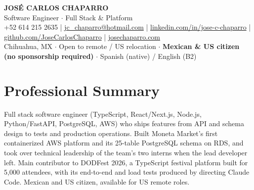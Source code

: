 \documentclass[10pt,letterpaper]{article}
\newif\ifbackend
\begin{document}

\begin{center}
    {\Huge\bfseries\color{accent} JOSÉ CARLOS CHAPARRO}\\[1pt]
    {\large \ifbackend Software Engineer $\cdot$ Backend \& Infrastructure\else Software Engineer $\cdot$ Full Stack \& Platform\fi}\\[2pt]
    \footnotesize
    +52 614 215 2635 | \href{mailto:jc_chaparro@hotmail.com}{jc\_chaparro@hotmail.com} | \href{https://www.linkedin.com/in/jose-c-chaparro/}{linkedin.com/in/jose-c-chaparro} | \href{https://github.com/JoseCarlosChaparro}{github.com/JoseCarlosChaparro} | \href{https://www.josechaparro.com}{josechaparro.com}\\[1pt]
    Chihuahua, MX $\cdot$ Open to remote / US relocation $\cdot$ \textbf{Mexican \& US citizen (no sponsorship required)} $\cdot$ Spanish (native) / English (B2)
\end{center}

\section*{Professional Summary}
\ifbackend
Backend software engineer (Python/FastAPI, PostgreSQL, AWS, Docker) who designs and runs production systems end to end. Built Moneta Market's first containerized AWS platform and its 25-table PostgreSQL schema on RDS, and took over technical leadership of the team's two interns when the lead developer left. Previously extended a VB.NET and SQL Server ERP used by 1,750+ employees across 170+ retail branches. Main contributor to DODFest 2026, built for 5,000 attendees. Mexican and US citizen, available for US remote roles.
\else
Full stack software engineer (TypeScript, React/Next.js, Node.js, Python/FastAPI, PostgreSQL, AWS) who ships features from API and schema design to tests and production operations. Built Moneta Market's first containerized AWS platform and its 25-table PostgreSQL schema on RDS, and took over technical leadership of the team's two interns when the lead developer left. Main contributor to DODFest 2026, a TypeScript festival platform built for 5,000 attendees, with its end-to-end and load tests produced by directing Claude Code. Mexican and US citizen, available for US remote roles.
\fi
\end{document}
